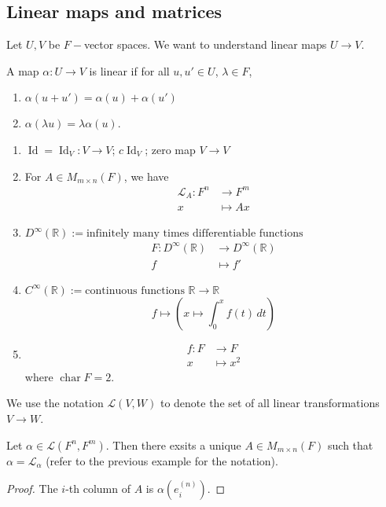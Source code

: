 \documentclass{scrartcl}
\def\R{\mathbb{R}}
\def\L{\mathcal{L}}
\DeclareMathOperator{\charf}{char}
\DeclareMathOperator{\id}{Id}
\begin{document}
\subsection{Linear maps and matrices}
Let $U, V$ be $F-$vector spaces. We want to understand linear maps $U \to V$. 
\begin{definition}
	A map $\alpha: U \to V$ is linear if for all $u, u' \in U$, $\lambda \in F$, 
	\begin{enumerate}
		\item $\alpha(u+u') = \alpha(u)+\alpha(u')$
		\item $\alpha(\lambda u) = \lambda \alpha(u)$.
	\end{enumerate}
\end{definition}
\begin{example}
	\begin{enumerate}
		\item $\id = \id_V: V \to V$; $c\id_V$; zero map $V\to V$
		\item For $A \in M_{m \times n}(F)$, we have
		\begin{align*}
			\mathcal{L}_A: F^n &\to F^m \\
			x &\mapsto Ax
		\end{align*}
		\item $D^\infty(\R) := \text{infinitely many times differentiable functions}$
		\begin{align*}
			F: D^\infty(\R) &\to D^\infty(\R) \\
			f &\mapsto f'
		\end{align*}
		\item $C^\infty(\R) := \text{continuous functions $\R \to \R$}$
		\[f \mapsto \left(x \mapsto \int_0^x f(t)\,dt\right)\]
		\item \begin{align*}
			f: F &\to F \\
			x &\mapsto x^2
		\end{align*}
		where $\charf{F}=2$. 
	\end{enumerate}
\end{example}
We use the notation $\L(V, W)$ to denote the set of all linear transformations $V \to W$. 
\begin{lemma} \label{uniquematrix}
	Let $\alpha \in \L(F^n, F^m)$. Then there exsits a unique $A \in M_{m \times n}(F)$ such that $\alpha = \L_\alpha$ (refer to the previous example for the notation).
\end{lemma}
\begin{proof}
	The $i$-th column of $A$ is $\alpha(e_i^{(n)})$. 
\end{proof}
\end{document}
